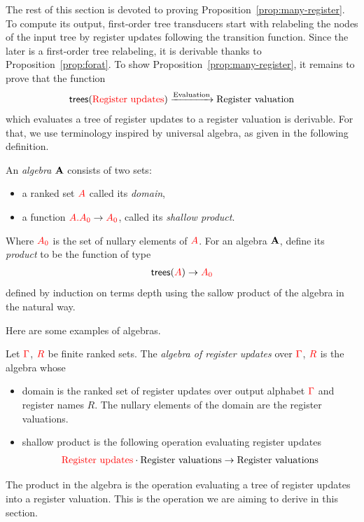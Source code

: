 The rest of this section is devoted to proving Proposition~\ref{prop:many-register}. To compute its output, first-order tree transducers start with relabeling the nodes of the input tree by register updates following the transition function. Since the later is a first-order tree relabeling, it is derivable thanks to Proposition~\ref{prop:forat}. To show Proposition~\ref{prop:many-register}, it remains to prove that the function
\begin{align*}
\mathsf {trees}({\color{red}{\text{Register updates}}}) \xrightarrow{\text{Evaluation}} \text{Register valuation} 
\end{align*}
which evaluates a tree of register updates to a register valuation is derivable. For that, we use  terminology inspired by universal algebra, as given in the following definition. 
\begin{definition}
    An \emph{algebra} ${\color{black}\mathbf A}$ consists of two sets: 
 \begin{itemize}
 \item a ranked set ${\color{red}{A}}$ called its \emph{domain},
\item  a function ${\color{red}{{\color{red}{A . A}}_0}} \to {\color{red}{A_0}}$, called its \emph{shallow product}.
 \end{itemize}
 Where ${\color{red}{A_0}}$ is the set of nullary elements of ${\color{red}{A}}$. 
    For an algebra ${\color{black}\mathbf A}$, define its \emph{product} to be the function of type
    \begin{align*}
\mathsf {trees}( {\color{red}{A}} ) \to {\color{red}{A_0}}
    \end{align*}
    defined by induction on terms depth using the sallow product of the algebra in the natural way.
\end{definition}
Here are some examples of algebras.
\begin{example} Let ${\color{red}{\Gamma}}$, ${\color{red}{R}}$ be finite ranked
sets. The \emph{algebra of register updates} over ${\color{red}{\Gamma}}$, ${\color{red}{R}}$ is the algebra whose 
\begin{itemize}
\item domain is the ranked set of register updates over output alphabet ${\color{red}{\Gamma}}$ and register names $R$. The nullary elements of the domain are the register valuations. 
\item shallow product is the following operation evaluating register updates 
    \begin{align*}
 {{\color{red}{\text{Register updates}}}} \cdot {\text{Register valuations}}  \to \text{Register valuations}
    \end{align*}
\end{itemize}  
The product in the algebra is the operation evaluating a tree of register updates into a register valuation. This  is the operation we are aiming to derive in this section.
\end{example}


